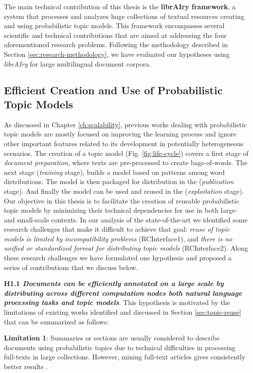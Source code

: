 The main technical contribution of this thesis is the \textbf{librAIry framework}, a system that processes and analyzes huge collections of textual resources creating and using probabilistic topic models. This framework encompasses several scientific and technical contributions that are aimed at addressing the four aforementioned research problems. Following the methodology described in Section \ref{sec:research-methodology}, we have evaluated our hypotheses using \textit{librAIry} for large multilingual document corpora. 

\subsection{Efficient Creation and Use of Probabilistic Topic Models}

As discussed in Chapter \ref{ch:scalability}, previous works dealing with probabilistic topic models are mostly focused on improving the learning process and ignore other important features related to its development in potentially heterogeneous scenarios. The creation of a topic model (Fig. \ref{fig:life-cycle}) covers a first stage of \textit{document preparation}, where texts are pre-processed to create bags-of-words. The next stage (\textit{training} stage),  builds a model based on patterns among word distributions. The model is then packaged for distribution in the (\textit{publication} stage). And finally the model can be used and reused in the (\textit{exploitation} stage). Our objective in this thesis is to facilitate the creation of reusable probabilistic topic models by minimizing their technical dependencies for use in both large- and small-scale contexts. In our analysis of the state-of-the-art we identified some research challenges that make it difficult to achieve that goal:  \textit{reuse of topic models is limited by incompatibility problems} (RCInterface1), and \textit{there is no unified or standardized format for distributing topic models} (RCInterface2). Along these research challenges we have formulated one hypothesis and proposed a series of contributions that we discuss below.

\textbf{H1.1 \textit{Documents can be efficiently annotated on a large scale by distributing across different computation nodes both natural language processing tasks and topic models}}. This hypothesis is motivated by the limitations of existing works identified and discussed in Section \ref{sec:topic-reuse} that can be summarized as follows:

\textbf{Limitation 1}: Summaries or sections are usually considered to describe documents using probabilistic topics due to technical difficulties in processing full-texts in large collections. However, mining full-text articles gives consistently better results \citep{Westergaard2017}.

